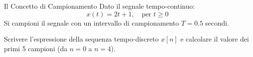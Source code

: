 
\begin{esercizio}{Il Concetto di Campionamento}
    Dato il segnale tempo-continuo:
    \[
        x(t) = 2t + 1, \quad \text{per } t \ge 0
    \]
    Si campioni il segnale con un intervallo di campionamento $T = 0.5$ secondi.
    
    Scrivere l'espressione della sequenza tempo-discreto $x[n]$ e calcolare il valore dei primi 5 campioni (da $n=0$ a $n=4$).
\end{esercizio}
